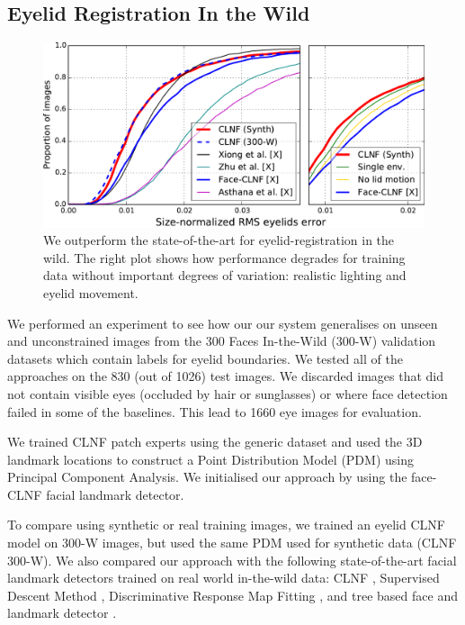 \subsection{Eyelid Registration In the Wild}


\begin{figure}
    \centering
    \includegraphics[width=\columnwidth]{figs/CLNF_300W_experiment.pdf}
    \caption{We outperform the state-of-the-art for eyelid-registration in the wild. The right plot shows how performance degrades for training data without important degrees of variation: realistic lighting and eyelid movement.}
    \label{fig:clnf_results_wild}
\end{figure}

% 

We performed an experiment to see how our our system generalises on unseen and unconstrained images from the 300 Faces In-the-Wild (300-W) \cite{sagonas2013300} validation datasets which contain labels for eyelid boundaries. We tested all of the approaches on the 830 (out of 1026) test images. We discarded images that did not contain visible eyes (occluded by hair or sunglasses) or where face detection failed in some of the baselines. This lead to 1660 eye images for evaluation.

We trained CLNF patch experts using the generic \dataset dataset and used the 3D landmark locations to construct a Point Distribution Model (PDM) using Principal Component Analysis. 
We initialised our approach by using the face-CLNF \cite{baltrusaitis2013constrained} facial landmark detector.

To compare using synthetic or real training images, we trained an eyelid CLNF model on 300-W images, but used the same PDM used for synthetic data (CLNF 300-W).
We also compared our approach with the following state-of-the-art facial landmark detectors trained on real world in-the-wild data: CLNF \cite{baltrusaitis2013constrained}, Supervised Descent Method \cite{Xiong2013sdm}, Discriminative Response Map Fitting \cite{Asthana2013drmf}, and tree based face and landmark detector \cite{Zhu2012tree}. 

